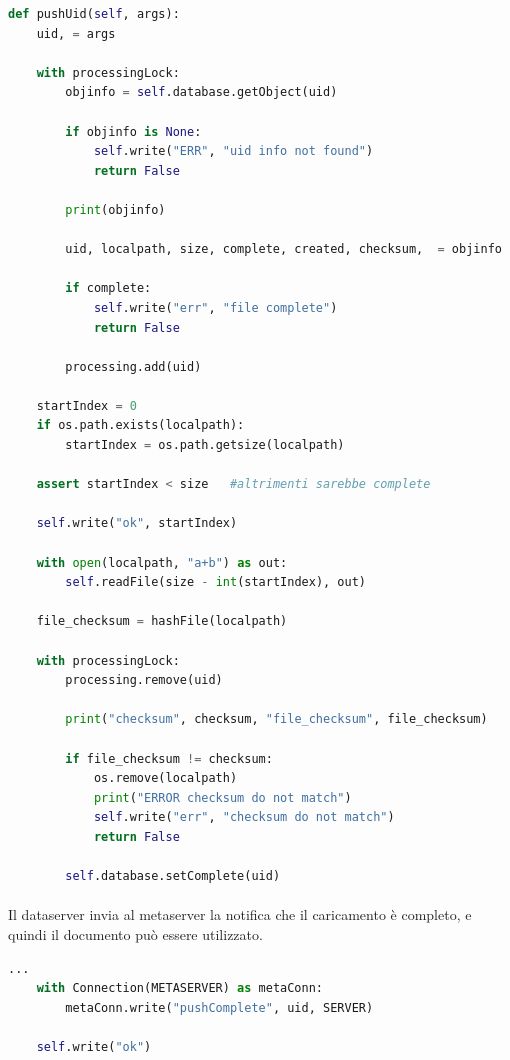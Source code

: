 \documentclass{article}
\begin{document}
\begin{lstlisting}[language=Python, title=Dataserver]
def pushUid(self, args):
    uid, = args

    with processingLock:
        objinfo = self.database.getObject(uid)

        if objinfo is None:
            self.write("ERR", "uid info not found")
            return False

        print(objinfo)

        uid, localpath, size, complete, created, checksum,  = objinfo

        if complete:
            self.write("err", "file complete")
            return False

        processing.add(uid)

    startIndex = 0
    if os.path.exists(localpath):
        startIndex = os.path.getsize(localpath)

    assert startIndex < size   #altrimenti sarebbe complete

    self.write("ok", startIndex)

    with open(localpath, "a+b") as out:
        self.readFile(size - int(startIndex), out)

    file_checksum = hashFile(localpath)

    with processingLock:
        processing.remove(uid)

        print("checksum", checksum, "file_checksum", file_checksum)

        if file_checksum != checksum:
            os.remove(localpath)
            print("ERROR checksum do not match")
            self.write("err", "checksum do not match")
            return False

        self.database.setComplete(uid)
\end{lstlisting}

\paragraph{} Il dataserver invia al metaserver la notifica che il caricamento è completo, e quindi il documento può essere utilizzato.

\begin{lstlisting}[language=Python, title=Dataserver]
    ...
    with Connection(METASERVER) as metaConn:
        metaConn.write("pushComplete", uid, SERVER)

    self.write("ok")
\end{lstlisting}
\end{document}
